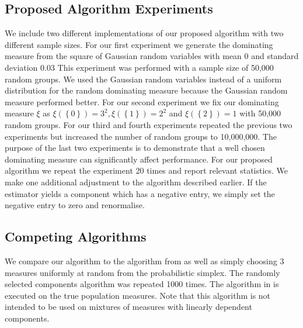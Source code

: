 \documentclass[aos,preprint]{imsart}
\theoremstyle{plain}
\theoremstyle{defintion}
\begin{document}
	\subsection{Proposed Algorithm Experiments}
	We include two different implementations of our proposed algorithm with two different sample sizes. For our first experiment we generate the dominating measure from the square of Gaussian random variables with mean $0$ and standard deviation 0.03 This experiment was performed with a sample size of 50,000 random groups. We used the Gaussian random variables instead of a uniform distribution for the random dominating measure because the Gaussian random measure performed better. For our second experiment we fix our dominating measure $\xi$ as $\xi\left( \left\{ 0 \right\} \right) = 3^2, \xi\left( \left\{ 1 \right\} \right) = 2^2$ and $\xi\left( \left\{ 2 \right\} \right) = 1$ with 50,000 random groups. For our third and fourth experiments repeated the previous two experiments but increased the number of random groups to 10,000,000. The purpose of the last two experiments is to demonstrate that a well chosen dominating measure can significantly affect performance. For our proposed algorithm we repeat the experiment 20 times and report relevant statistics. We make one additional adjustment to the algorithm described earlier. If the estimator yields a component which has a negative entry, we simply set the negative entry to zero and renormalise. 
	\subsection{Competing Algorithms}
	We compare our algorithm to the algorithm from \cite{anandkumar14} as well as simply choosing $3$ measures uniformly at random from the probabilistic simplex. The randomly selected components algorithm was repeated 1000 times. The algorithm in \cite{anandkumar14} is executed on the true population measures. Note that this algorithm is not intended to be used on mixtures of measures with linearly dependent components.
\end{document}
